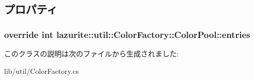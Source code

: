 \subsection{プロパティ}
\hypertarget{classlazurite_1_1util_1_1_color_factory_1_1_color_pool_ad14f188efe24f769e442a76dffed224e}{
\subsubsection[{entries}]{\setlength{\rightskip}{0pt plus 5cm}override int lazurite::util::ColorFactory::ColorPool::entries}}
\label{classlazurite_1_1util_1_1_color_factory_1_1_color_pool_ad14f188efe24f769e442a76dffed224e}


このクラスの説明は次のファイルから生成されました:\begin{DoxyCompactItemize}
\item 
lib/util/ColorFactory.cs\end{DoxyCompactItemize}
